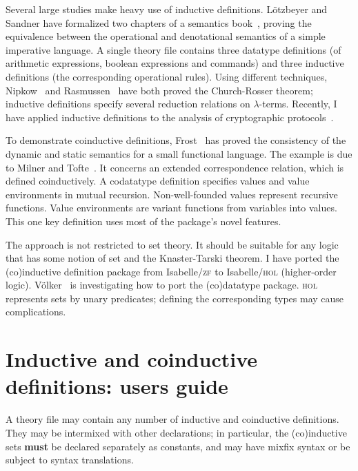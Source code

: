 \documentclass[12pt]{article}
\newif\ifshort%
\newcommand\defn[1]{{\bf#1}}
\begin{document}
Several large studies make heavy use of inductive definitions.  L\"otzbeyer
and Sandner have formalized two chapters of a semantics book~\cite{winskel93},
proving the equivalence between the operational and denotational semantics of
a simple imperative language.  A single theory file contains three datatype
definitions (of arithmetic expressions, boolean expressions and commands) and
three inductive definitions (the corresponding operational rules).  Using
different techniques, Nipkow~\cite{nipkow-CR} and Rasmussen~\cite{rasmussen95}
have both proved the Church-Rosser theorem; inductive definitions specify
several reduction relations on $\lambda$-terms.  Recently, I have applied
inductive definitions to the analysis of cryptographic
protocols~\cite{paulson-markt}. 

To demonstrate coinductive definitions, Frost~\cite{frost95} has proved the
consistency of the dynamic and static semantics for a small functional
language.  The example is due to Milner and Tofte~\cite{milner-coind}.  It
concerns an extended correspondence relation, which is defined coinductively.
A codatatype definition specifies values and value environments in mutual
recursion.  Non-well-founded values represent recursive functions.  Value
environments are variant functions from variables into values.  This one key
definition uses most of the package's novel features.

The approach is not restricted to set theory.  It should be suitable for any
logic that has some notion of set and the Knaster-Tarski theorem.  I have
ported the (co)inductive definition package from Isabelle/\textsc{zf} to
Isabelle/\textsc{hol} (higher-order logic).  V\"olker~\cite{voelker95}
is investigating how to port the (co)datatype package.  \textsc{hol}
represents sets by unary predicates; defining the corresponding types may
cause complications.


\begin{footnotesize}


\end{footnotesize}

\ifshort{}
\else
\newpage
\appendix
\section{Inductive and coinductive definitions: users guide}
A theory file may contain any number of inductive and coinductive
definitions.  They may be intermixed with other declarations; in
particular, the (co)inductive sets \defn{must} be declared separately as
constants, and may have mixfix syntax or be subject to syntax translations.
\end{document}
